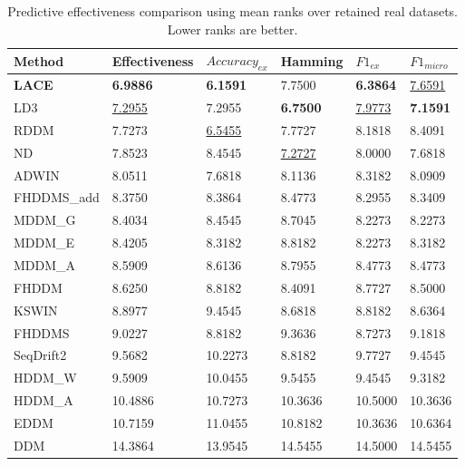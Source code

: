 \begin{table}
\caption{Predictive effectiveness comparison using mean ranks over retained real datasets. Lower ranks are better.}
\label{tab:baseline_effectiveness_mean_ranks}
\begin{tabular}{llllll}
\toprule
Method & Effectiveness & $Accuracy_{ex}$ & Hamming & $F1_{ex}$ & $F1_{micro}$ \\
\midrule
\textbf{LACE} & \textbf{6.9886} & \textbf{6.1591} & 7.7500 & \textbf{6.3864} & \underline{7.6591} \\
LD3 & \underline{7.2955} & 7.2955 & \textbf{6.7500} & \underline{7.9773} & \textbf{7.1591} \\
RDDM & 7.7273 & \underline{6.5455} & 7.7727 & 8.1818 & 8.4091 \\
ND & 7.8523 & 8.4545 & \underline{7.2727} & 8.0000 & 7.6818 \\
ADWIN & 8.0511 & 7.6818 & 8.1136 & 8.3182 & 8.0909 \\
FHDDMS\_add & 8.3750 & 8.3864 & 8.4773 & 8.2955 & 8.3409 \\
MDDM\_G & 8.4034 & 8.4545 & 8.7045 & 8.2273 & 8.2273 \\
MDDM\_E & 8.4205 & 8.3182 & 8.8182 & 8.2273 & 8.3182 \\
MDDM\_A & 8.5909 & 8.6136 & 8.7955 & 8.4773 & 8.4773 \\
FHDDM & 8.6250 & 8.8182 & 8.4091 & 8.7727 & 8.5000 \\
KSWIN & 8.8977 & 9.4545 & 8.6818 & 8.8182 & 8.6364 \\
FHDDMS & 9.0227 & 8.8182 & 9.3636 & 8.7273 & 9.1818 \\
SeqDrift2 & 9.5682 & 10.2273 & 8.8182 & 9.7727 & 9.4545 \\
HDDM\_W & 9.5909 & 10.0455 & 9.5455 & 9.4545 & 9.3182 \\
HDDM\_A & 10.4886 & 10.7273 & 10.3636 & 10.5000 & 10.3636 \\
EDDM & 10.7159 & 11.0455 & 10.8182 & 10.3636 & 10.6364 \\
DDM & 14.3864 & 13.9545 & 14.5455 & 14.5000 & 14.5455 \\
\bottomrule
\end{tabular}
\end{table}
